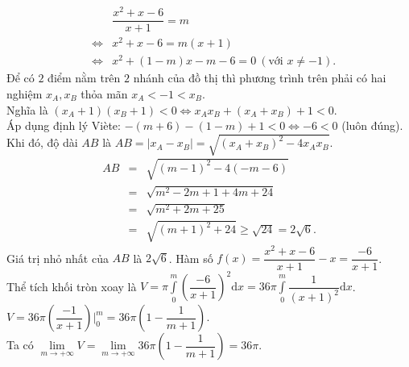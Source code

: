 \begin{ex}
{\begin{itemchoice}
			{\allowdisplaybreaks
				\begin{eqnarray*}
				&&\dfrac{x^2+x-6}{x+1} = m\\
				&\Leftrightarrow& x^2 + x - 6 = m(x+1)\\ 
				&\Leftrightarrow& x^2 + (1-m)x - m - 6 = 0\ (\text{với } x \neq -1).
			\end{eqnarray*}}
			Để có $2$ điểm nằm trên $2$ nhánh của đồ thị thì phương trình trên phải có hai nghiệm $x_A, x_B$ thỏa mãn $x_A < -1 < x_B$.\\
			Nghĩa là $(x_A + 1)(x_B + 1) < 0 \Leftrightarrow x_A x_B + (x_A + x_B) + 1 < 0$.\\
			Áp dụng định lý Viète: $-(m+6) - (1-m) + 1 < 0 \Leftrightarrow -6 < 0$ (luôn đúng).\\
			Khi đó, độ dài $AB$ là $AB = |x_A - x_B| = \sqrt{(x_A+x_B)^2 - 4x_Ax_B}$.
			{\allowdisplaybreaks
				\begin{eqnarray*} 
					AB &=& \sqrt{(m-1)^2 - 4(-m-6)} \\
					&=& \sqrt{m^2 - 2m + 1 + 4m + 24} \\
					&=& \sqrt{m^2 + 2m + 25} \\
					&=& \sqrt{(m+1)^2 + 24} \ge \sqrt{24} = 2\sqrt{6}.
			\end{eqnarray*}}
			Giá trị nhỏ nhất của $AB$ là $2\sqrt{6}$.
			\itemch Hàm số $f(x) = \dfrac{x^2+x-6}{x+1} - x = \dfrac{-6}{x+1}$.\\
			Thể tích khối tròn xoay là $V = \pi \displaystyle\int\limits_{0}^{m} \left( \dfrac{-6}{x+1} \right)^2 \mathrm{d}x = 36\pi \displaystyle\int\limits_{0}^{m} \dfrac{1}{(x+1)^2} \mathrm{d}x$.\\
			$V = 36\pi \left( \dfrac{-1}{x+1} \right) \bigg|_0^m = 36\pi \left( 1 - \dfrac{1}{m+1} \right)$.\\
			Ta có $\lim\limits_{m \to +\infty} V = \lim\limits_{m \to +\infty} 36\pi \left( 1 - \dfrac{1}{m+1} \right) = 36\pi$.
		\end{itemchoice}
	}
\end{ex}

